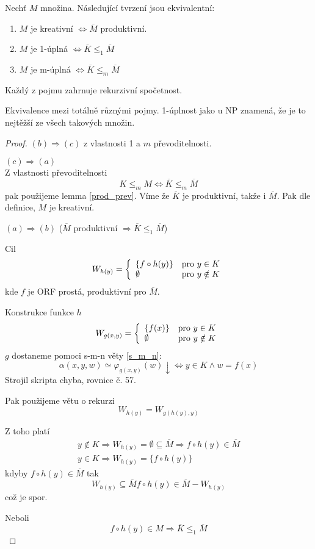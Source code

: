 \begin{theorem}
	Nechť $M$ množina.
	Následující tvrzení jsou ekvivalentní:
	\begin{enumerate}[label=(\alph*)]
	    	\item $M$ je kreativní $\iff \overline{M}$ produktivní.
		\item $M$ je 1-úplná $\iff \overline{K} \leq_1 \overline{M}$
		\item $M$ je m-úplná $\iff \overline{K} \leq_m \overline{M}$
	\end{enumerate}
	Každý z pojmu zahrnuje rekurzivní spočetnost.

	Ekvivalence mezi totálně různými pojmy. 1-úplnost jako u NP znamená, že je to nejtěžší ze všech takových množin.
\end{theorem}
\begin{proof}
	$(b) \Rightarrow (c)$ z vlastnosti 1 a $m$ převoditelnosti.

	$(c) \Rightarrow (a)$ \\
	Z vlastnosti převoditelnosti
	\[ K \leq_m M \iff \overline{K} \leq_m \overline{M} \]
	pak použijeme lemma \cref{prod_prev}.
	Víme že $\overline{K}$ je produktivní, takže i $\overline{M}$.
	Pak dle definice, $M$ je kreativní.

	$(a) \Rightarrow (b)$ ($\overline{M}$ produktivní $\Rightarrow \overline{K} \leq_1 \overline{M}$)

	Cil
	\[ W_{h(y)} = \left\{ \begin{array}{ll}  \{ f \circ h(y) \}  & \mbox{pro }  y \in K  \\  \emptyset  & \mbox{pro }  y \notin K  \end{array} \right. \]
	kde $f$ je ORF prostá, produktivní pro $\overline{M}$.

	Konstrukce funkce $h$
	\[ W_{g(x, y)} = \left\{ \begin{array}{ll}  \{ f(x) \}  & \mbox{pro }  y \in K  \\  \emptyset  & \mbox{pro }  y \notin K  \end{array} \right. \]
	$g$ dostaneme pomoci s-m-n věty \cref{s_m_n}:
	\[ \alpha(x, y, w) \simeq \varphi_{g(x, y)} (w) \downarrow \iff y \in K \land w = f(x) \]
	Strojil skripta chyba, rovnice č. 57.

	Pak použijeme větu o rekurzi
	\[ W_{h(y)} = W_{g(h(y), y)} \]

	Z toho platí
	\begin{gather*}
		y \notin K \Rightarrow W_{h(y)} = \emptyset \subseteq \overline{M} \Rightarrow f \circ h(y) \in \overline{M} \\
		y \in K \Rightarrow W_{h(y)} = \{ f \circ h(y) \}
	\end{gather*}
	kdyby $f \circ h(y) \in \overline{M}$ tak
	\[ W_{h(y)} \subseteq \overline{M} f \circ h(y) \in \overline{M} - W_{h(y)} \]
	což je spor.

	Neboli
	\[ f \circ h(y) \in M \Rightarrow \overline{K} \leq_1 \overline{M} \]
\end{proof}

